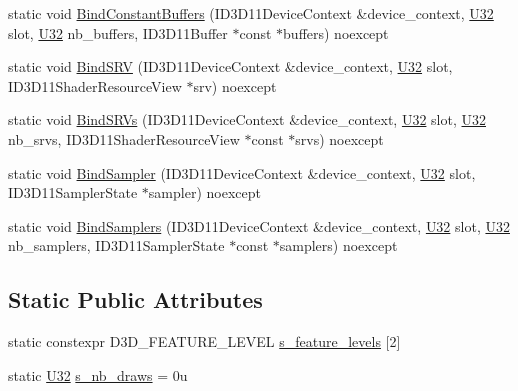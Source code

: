 \begin{DoxyCompactItemize}
\item 
static void \hyperlink{structmage_1_1rendering_1_1_pipeline_ad3a84d57712b74b98d10946482a78a2b}{Bind\+Constant\+Buffers} (I\+D3\+D11\+Device\+Context \&device\+\_\+context, \hyperlink{namespacemage_a41c104c036fba3756a74e19f793eeaa1}{U32} slot, \hyperlink{namespacemage_a41c104c036fba3756a74e19f793eeaa1}{U32} nb\+\_\+buffers, I\+D3\+D11\+Buffer $\ast$const $\ast$buffers) noexcept
\item 
static void \hyperlink{structmage_1_1rendering_1_1_pipeline_a28ed2d3639ac344b2d2334de54461ae9}{Bind\+S\+RV} (I\+D3\+D11\+Device\+Context \&device\+\_\+context, \hyperlink{namespacemage_a41c104c036fba3756a74e19f793eeaa1}{U32} slot, I\+D3\+D11\+Shader\+Resource\+View $\ast$srv) noexcept
\item 
static void \hyperlink{structmage_1_1rendering_1_1_pipeline_a38de6f4bfefc23eeeb50bdf0cc0e807d}{Bind\+S\+R\+Vs} (I\+D3\+D11\+Device\+Context \&device\+\_\+context, \hyperlink{namespacemage_a41c104c036fba3756a74e19f793eeaa1}{U32} slot, \hyperlink{namespacemage_a41c104c036fba3756a74e19f793eeaa1}{U32} nb\+\_\+srvs, I\+D3\+D11\+Shader\+Resource\+View $\ast$const $\ast$srvs) noexcept
\item 
static void \hyperlink{structmage_1_1rendering_1_1_pipeline_a3f43c5b1ed2d75d6c5ecf4b477185d0c}{Bind\+Sampler} (I\+D3\+D11\+Device\+Context \&device\+\_\+context, \hyperlink{namespacemage_a41c104c036fba3756a74e19f793eeaa1}{U32} slot, I\+D3\+D11\+Sampler\+State $\ast$sampler) noexcept
\item 
static void \hyperlink{structmage_1_1rendering_1_1_pipeline_a10286b4e2637c2956ecbcb0217d694fa}{Bind\+Samplers} (I\+D3\+D11\+Device\+Context \&device\+\_\+context, \hyperlink{namespacemage_a41c104c036fba3756a74e19f793eeaa1}{U32} slot, \hyperlink{namespacemage_a41c104c036fba3756a74e19f793eeaa1}{U32} nb\+\_\+samplers, I\+D3\+D11\+Sampler\+State $\ast$const $\ast$samplers) noexcept
\end{DoxyCompactItemize}
\subsection*{Static Public Attributes}
\begin{DoxyCompactItemize}
\item 
static constexpr D3\+D\+\_\+\+F\+E\+A\+T\+U\+R\+E\+\_\+\+L\+E\+V\+EL \hyperlink{structmage_1_1rendering_1_1_pipeline_a9748450c877ec6997796826258f3cbda}{s\+\_\+feature\+\_\+levels} \mbox{[}2\mbox{]}
\item 
static \hyperlink{namespacemage_a41c104c036fba3756a74e19f793eeaa1}{U32} \hyperlink{structmage_1_1rendering_1_1_pipeline_a47d649cdfea830ee048554accd2cab10}{s\+\_\+nb\+\_\+draws} = 0u
\end{DoxyCompactItemize}

